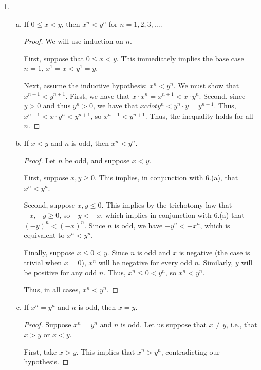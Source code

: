\documentclass{amsart}
\begin{document}
\begin{enumerate}[1.]
\begin{enumerate}[(i)]
\begin{proof}
    Second, take the case $a>b$. This implies, in cojunction with 5.(ix), that $a^{2}>b^{2}$, contradicting our hypothesis.

    Thus, it must be that $a<b$.\end{proof}
  \end{enumerate}
\item
  \begin{enumerate}[(a)]
  \item If $0 \leq x<y$, then $x^{n}<y^{n}$ for $n=1,2,3, \ldots$.
    \begin{proof}
      We will use induction on $n$.

      First, suppose that $0 \leq x<y$. This immediately implies the base case $n=1$, $x^{1}=x<y^{1}=y$.

      Next, assume the inductive hypothesis: $x^{n}<y^{n}$. We must show that $x^{n+1}<y^{n+1}$. First, we have that $x \cdot x^{n}=x^{n+1}<x \cdot y^{n}$. Second, since $y>0$ and thus $y^{n}>0$, we have that $x cdot y^{n}<y^{n} \cdot y=y^{n+1}$. Thus, $x^{n+1}<x \cdot y^{n}<y^{n+1}$, so $x^{n+1}<y^{n+1}$. Thus, the inequality holds for all $n$.
    \end{proof}
  \item If $x<y$ and $n$ is odd, then $x^{n}<y^{n}$.
    \begin{proof}
      Let $n$ be odd, and suppose $x<y$.

      First, suppose $x, y \geq 0$. This implies, in conjunction with 6.(a), that $x^{n}<y^{n}$.

      Second, suppose $x,y \leq 0$. This implies by the trichotomy law that $-x, -y \geq 0$, so $-y<-x$, which implies in conjunction with 6.(a) that $(-y)^{n}<(-x)^{n}$. Since $n$ is odd, we have $-y^{n}<-x^{n}$, which is equivalent to $x^{n}<y^{n}$.

      Finally, suppose $x \leq 0 < y$. Since $n$ is odd and $x$ is negative (the case is trivial when $x=0$), $x^{n}$ will be negative for every odd $n$. Similarly, $y$ will be positive for any odd $n$. Thus, $x^{n} \leq 0 <y^{n}$, so $x^{n}<y^{n}$.

      Thus, in all cases, $x^{n}<y^{n}$.
    \end{proof}
  \item If $x^{n}=y^{n}$ and $n$ is odd, then $x=y$.
\begin{proof}
    Suppose $x^{n}=y^{n}$ and $n$ is odd. Let us suppose that $x \neq y$, i.e., that $x>y$ or $x<y$.

    First, take $x>y$. This implies that $x^{n}>y^{n}$, contradicting our hypothesis.


\end{proof}
\end{enumerate}
\end{enumerate}
\end{document}
